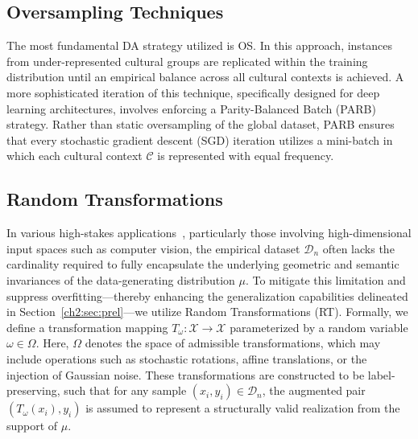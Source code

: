 \subsection{Oversampling Techniques}
\label{ch2:sec:os}
The most fundamental DA strategy utilized is OS. 
In this approach, instances from under-represented cultural groups are replicated within the training distribution until an empirical balance across all cultural contexts is achieved.
A more sophisticated iteration of this technique, specifically designed for deep learning architectures, involves enforcing a Parity-Balanced Batch (PARB) strategy. 
Rather than static oversampling of the global dataset, PARB ensures that every stochastic gradient descent (SGD) iteration utilizes a mini-batch in which each cultural context $\mathcal{C}$ is represented with equal frequency.

\subsection{Random Transformations}

\label{ch2:sec:RT}
In various high-stakes applications~\citep{shorten2019survey}, particularly those involving high-dimensional input spaces such as computer vision, the empirical dataset $\mathcal{D}_n$ often lacks the cardinality required to fully encapsulate the underlying geometric and semantic invariances of the data-generating distribution $\mu$. 
To mitigate this limitation and suppress overfitting—thereby enhancing the generalization capabilities delineated in Section~\ref{ch2:sec:prel}—we utilize Random Transformations (RT).
Formally, we define a transformation mapping $T_\omega: \mathcal{X} \rightarrow \mathcal{X}$ parameterized by a random variable $\omega \in \Omega$. 
Here, $\Omega$ denotes the space of admissible transformations, which may include operations such as stochastic rotations, affine translations, or the injection of Gaussian noise. 
These transformations are constructed to be label-preserving, such that for any sample $(x_i, y_i) \in \mathcal{D}_n$, the augmented pair $(T_\omega(x_i), y_i)$ is assumed to represent a structurally valid realization from the support of $\mu$.

